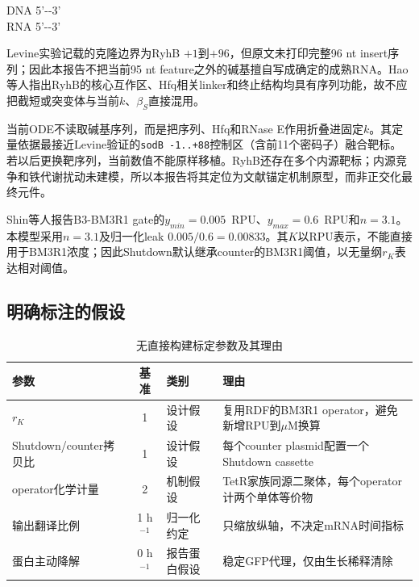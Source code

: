 \documentclass[UTF8,a4paper,11pt,fontset=windows]{ctexart}
\begin{document}
\begin{center}
\begin{minipage}{0.96\textwidth}\small\ttfamily\raggedright
DNA 5'--3'\\[1mm]
RNA 5'--3'
\end{minipage}
\end{center}

Levine实验记载的克隆边界为RyhB $+1$到$+96$，但原文未打印完整96 nt insert序列；因此本报告不把当前95 nt feature之外的碱基擅自写成确定的成熟RNA。Hao等人指出RyhB的核心互作区、Hfq相关linker和终止结构均具有序列功能，故不应把截短或突变体与当前$k$、$\beta_S$直接混用。

当前ODE不读取碱基序列，而是把序列、Hfq和RNase E作用折叠进固定$k$。其定量依据最接近Levine验证的\nolinkurl{sodB -1..+88}控制区（含前11个密码子）融合靶标。若以后更换靶序列，当前数值不能原样移植。RyhB还存在多个内源靶标；内源竞争和铁代谢扰动未建模，所以本报告将其定位为文献锚定机制原型，而非正交化最终元件。

Shin等人报告B3-BM3R1 gate的\mbox{$y_{min}=0.005$ RPU}、\mbox{$y_{max}=0.6$ RPU}和$n=3.1$。本模型采用$n=3.1$及归一化leak $0.005/0.6=0.00833$。其$K$以RPU表示，不能直接用于BM3R1浓度；因此Shutdown默认继承counter的BM3R1阈值，以无量纲$r_K$表达相对阈值。

\subsection{明确标注的假设}
\begin{table}[H]\centering\small
\caption{无直接构建标定参数及其理由}
\begin{tabularx}{\textwidth}{@{}YcYY@{}}
\toprule
参数 & 基准 & 类别 & 理由\\
\midrule
$r_K$ & 1 & 设计假设 & 复用RDF的BM3R1 operator，避免新增RPU到$\mu$M换算\\
Shutdown/counter拷贝比 & 1 & 设计假设 & 每个counter plasmid配置一个Shutdown cassette\\
operator化学计量 & 2 & 机制假设 & TetR家族同源二聚体，每个operator计两个单体等价物\\
输出翻译比例 & 1 h$^{-1}$ & 归一化约定 & 只缩放纵轴，不决定mRNA时间指标\\
蛋白主动降解 & 0 h$^{-1}$ & 报告蛋白假设 & 稳定GFP代理，仅由生长稀释清除\\
\bottomrule
\end{tabularx}
\end{table}
\end{document}
